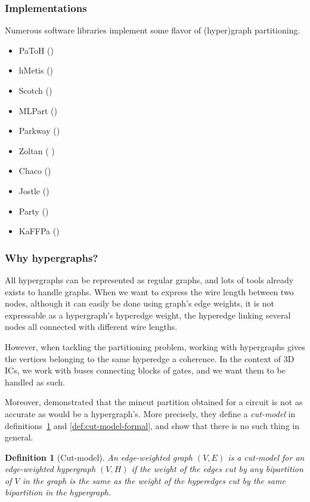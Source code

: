 \documentclass[12pt,a4paper]{article}
\theoremstyle{customdef}
\newtheorem{definition}{Definition}
\begin{document}
\subsubsection{Implementations}
Numerous software libraries implement some flavor of (hyper)graph partitioning.
\begin{itemize}
	\item PaToH (\citet{Aykanat2011})
	\item hMetis (\citet{Karypis1999})
	\item Scotch (\citet{Aykanat2011})
	\item MLPart (\citet{Caldwell2000})
	\item Parkway (\citet{Trifunovic2008})
	\item Zoltan (\citet{Devine2006}
)	\item Chaco (\citet{Lotfifar2015})
	\item Jostle (\citet{Walshaw1998})
	\item Party (\citet{Preis97party})
	\item KaFFPa (\citet{Holtgrewe2010})
\end{itemize}
\subsubsection{Why hypergraphs?}
All hypergraphs can be represented as regular graphs, and lots of tools already exists to handle graphs.
When we want to express the wire length between two nodes, although it can easily be done using graph's edge weights, it is not expressable as a hypergraph's hyperedge weight, the hyperedge linking several nodes all connected with different wire lengths.

However, when tackling the partitioning problem, working with hypergraphs gives the vertices belonging to the same hyperedge a coherence.
In the context of 3D ICs, we work with buses connecting blocks of gates, and we want them to be handled as such.

Moreover, \citet{Ihler1993} demonstrated that the mincut partition obtained for a circuit is not as accurate as would be a hypergraph's.
More precisely, they define a \textit{cut-model} in definitions~\ref{def:cut-model} and \ref{def:cut-model-formal}, and show that there is no such thing in general.

\begin{definition}[Cut-model]\label{def:cut-model}
An edge-weighted graph $(V,E)$ is a cut-model for an edge-weighted hypergraph $(V,H)$ if the weight of the edges cut by any bipartition of $V$ in the graph is the same as the weight of the hyperedges cut by the same bipartition in the hypergraph.
\end{definition}
\end{document}
